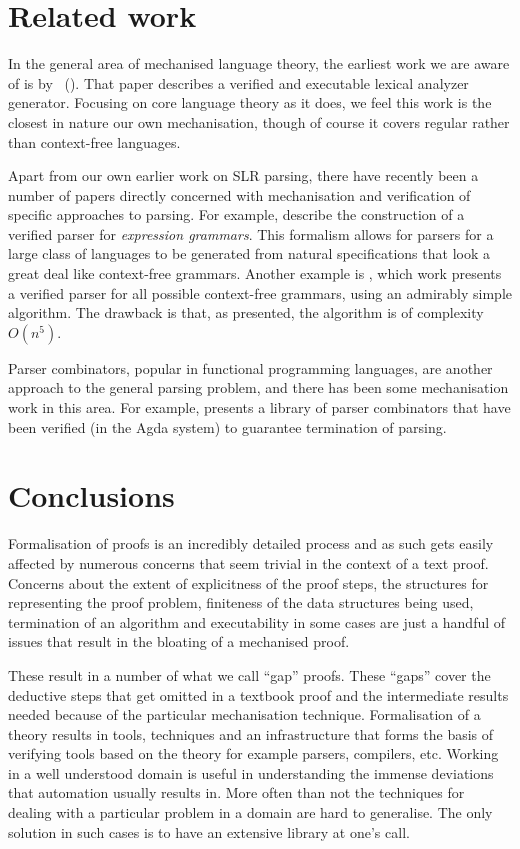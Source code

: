 \section{Related work}

In the general area of mechanised language theory, the earliest work we are aware of is by \citeauthor{nipkow98}~(\citeyear{nipkow98}).
That paper describes a verified and executable lexical analyzer generator.
%
Focusing on core language theory as it does, we feel this work is the closest in nature our own mechanisation, though of course it covers regular rather than context-free languages.

Apart from our own earlier work on SLR parsing, there have recently been a number of papers directly concerned with mechanisation and verification of specific approaches to parsing.
For example, \cite{koprowski11:trx} describe the construction of a verified parser for \emph{expression grammars}.
This formalism allows for parsers for a large class of languages to be generated from natural specifications that look a great deal like context-free grammars.
Another example is \cite{ridge2011:cfg-parsing}, which work presents a verified parser for all possible context-free grammars, using an admirably simple algorithm.
The drawback is that, as presented, the algorithm is of complexity~$O(n^5)$.

Parser combinators, popular in functional programming languages, are another approach to the general parsing problem, and there has been some mechanisation work in this area.
For example, \citet{Danielsson2010:TPC} presents a library of parser combinators that have been verified (in the Agda system) to guarantee termination of parsing.


\section{Conclusions}


Formalisation of proofs is an incredibly detailed process and as such
gets easily affected by numerous concerns that seem trivial in the
context of a text proof. Concerns about the extent of explicitness of
the proof steps, the structures for representing the proof problem,
finiteness of the data structures being used, termination of an
algorithm and executability in some cases are just a handful of issues
that result in the bloating of a mechanised proof.

These result in a number of what we call ``gap'' proofs. These
``gaps'' cover the deductive steps that get omitted in a textbook
proof and the intermediate results needed because of the particular
mechanisation technique. Formalisation of a theory results in tools,
techniques and an infrastructure that forms the basis of verifying
tools based on the theory for example parsers, compilers, etc. Working
in a well understood domain is useful in understanding the immense
deviations that automation usually results in.  More often than not
the techniques for dealing with a particular problem in a domain are
hard to generalise. The only solution in such cases is to have an
extensive library at one's call.

